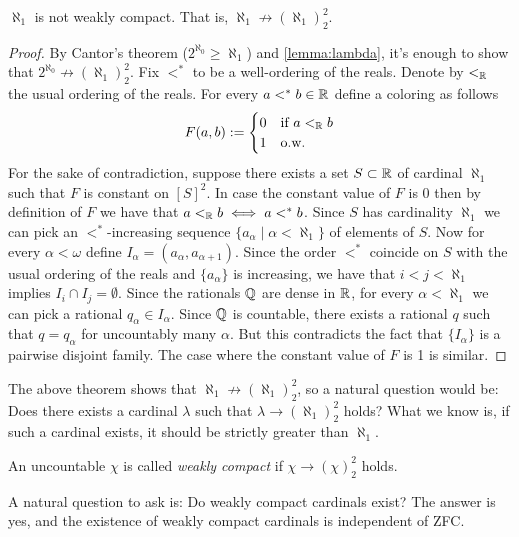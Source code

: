 \begin{theorem}[Sierpinski 1933]
    $\aleph_1$ is not weakly compact. That is, $\aleph_1\not\to(\aleph_1)_2^2$.
\end{theorem}
\begin{proof}
    By Cantor's theorem ($2^{\aleph_0}\geq \aleph_1$) and \ref{lemma:lambda}, it's enough to show that $2^{\aleph_0}\not\to(\aleph_1)_2^2$. Fix $<^*$ to be a well-ordering of the reals. Denote by $<_\mathbb R$ the usual ordering of the reals. For every $a<^*b\in\mathbb R$ define a coloring as follows
    \[
    F(a, b) := \begin{cases}
        0 & \text{if } a<_\mathbb R b \\
        1 & \text{o.w.}
    \end{cases}
    \]
    For the sake of contradiction, suppose there exists a set $S\subset\mathbb R$ of cardinal $\aleph_1$ such that $F$ is constant on $[S]^2$. 
    In case the constant value of $F$ is 0 then by definition of $F$ we have that $a<_\mathbb R b\iff a<^* b$. Since $S$ has cardinality $\aleph_1$ we can pick an $<^*$-increasing sequence $\{a_\alpha\mid \alpha<\aleph_1\}$ of elements of $S$. Now for every $\alpha<\omega$ define $I_\alpha=(a_\alpha, a_{\alpha+1})$. Since the order $<^*$ coincide on $S$ with the usual ordering of the reals and $\{a_\alpha\}$ is increasing, we have that $i<j<\aleph_1$ implies $I_i\cap I_j=\emptyset$. Since the rationals $\mathbb Q$ are dense in $\mathbb R$, for every $\alpha<\aleph_1$ we can pick a rational $q_\alpha\in I_\alpha$. Since $\mathbb Q$ is countable, there exists a rational $q$ such that $q=q_\alpha$ for uncountably many $\alpha$. But this contradicts the fact that $\{I_\alpha\}$ is a pairwise disjoint family. The case where the constant value of $F$ is 1 is similar.
\end{proof}

The above theorem shows that $\aleph_1\not\to(\aleph_1)_2^2$, so a natural question would be: Does there exists a cardinal $\lambda$ such that $\lambda\to(\aleph_1)_2^2$ holds? What we know is, if such a cardinal exists, it should be strictly greater than $\aleph_1$. 

\begin{definition}
    An uncountable $\chi$ is called \emph{weakly compact} if $\chi\to(\chi)_2^2$ holds.
\end{definition}

A natural question to ask is: Do weakly compact cardinals exist? The answer is yes, and the existence of weakly compact cardinals is independent of ZFC.

